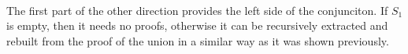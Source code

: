 \begin{code}
    \AgdaSymbol{\AgdaUnderscore{}\}}\AgdaSpace{}%
    \AgdaSymbol{(}\AgdaSpace{}%
    \AgdaOperator{\AgdaInductiveConstructor{,}}\AgdaSpace{}%
    \AgdaSymbol{)}\AgdaSpace{}%
    \AgdaSymbol{(}\AgdaSpace{}%
    \AgdaOperator{\AgdaInductiveConstructor{,}}\AgdaSpace{}%
    \AgdaSymbol{)}\AgdaSpace{}%
    \AgdaSymbol{|}\AgdaSpace{}%
    \AgdaSpace{}%
    \AgdaSpace{}%
    \AgdaSpace{}%
    \AgdaSymbol{=}\<%
    \\
    \>[2][@{}l@{\AgdaIndent{0}}]%
    \>[4]\AgdaSpace{}%
    \AgdaSpace{}%
    \AgdaSpace{}%
    \AgdaSymbol{(}\AgdaSpace{}%
    \AgdaSpace{}%
    \AgdaOperator{\AgdaInductiveConstructor{,}}\AgdaSpace{}%
    \AgdaSymbol{)}\AgdaSpace{}%
    \AgdaSymbol{(}\AgdaSpace{}%
    \AgdaOperator{\AgdaInductiveConstructor{,}}\AgdaSpace{}%
    \AgdaSymbol{)}\<%
\end{code}

The first part of the other direction provides the left side of the conjunciton. If $S_{1}$ is empty, then it needs no proofs, otherwise it can be recursively extracted and rebuilt from the proof of the union in a similar way as it was shown previously.

